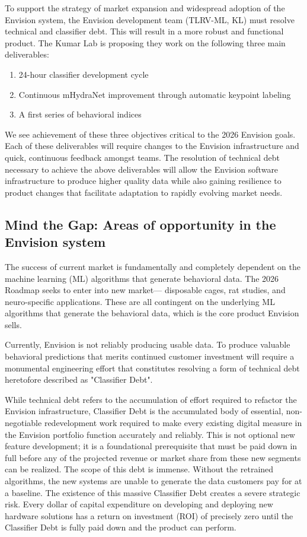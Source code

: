 \documentclass[11pt,onecolumn]{article}
\begin{document}
To support the strategy of market expansion and widespread adoption of the Envision system, the Envision development team (TLRV-ML, KL) must resolve technical and classifier debt. This will result in a more robust and functional product. The Kumar Lab is proposing they work on the following three main deliverables:

\begin{enumerate}
    \item 24-hour classifier development cycle
    \item Continuous mHydraNet improvement through automatic keypoint labeling
    \item A first series of behavioral indices
\end{enumerate}

We see achievement of these three objectives critical to the 2026 Envision goals. Each of these deliverables will require changes to the Envision infrastructure and quick, continuous feedback amongst teams. The resolution of technical debt necessary to achieve the above deliverables will allow the Envision software infrastructure to produce higher quality data while also gaining resilience to product changes that facilitate adaptation to rapidly evolving market needs.

\subsection{Mind the Gap: Areas of opportunity in the Envision system}

The success of current market is fundamentally and completely dependent on the machine learning (ML) algorithms that generate behavioral data. The 2026 Roadmap seeks to enter into new market— disposable cages, rat studies, and neuro-specific applications. These are all contingent on the underlying ML algorithms that generate the behavioral data, which is the core product Envision sells.

Currently, Envision is not reliably producing usable data. To produce valuable behavioral predictions that merits continued customer investment will require a monumental engineering effort that constitutes resolving a form of technical debt heretofore described as "Classifier Debt".

While technical debt refers to the accumulation of effort required to refactor the Envision infrastructure, Classifier Debt is the accumulated body of essential, non-negotiable redevelopment work required to make every existing digital measure in the Envision portfolio function accurately and reliably. This is not optional new feature development; it is a foundational prerequisite that must be paid down in full before any of the projected revenue or market share from these new segments can be realized. The scope of this debt is immense. Without the retrained algorithms, the new systems are unable to generate the data customers pay for at a baseline. The existence of this massive Classifier Debt creates a severe strategic risk. Every dollar of capital expenditure on developing and deploying new hardware solutions has a return on investment (ROI) of precisely zero until the Classifier Debt is fully paid down and the product can perform.
\end{document}
